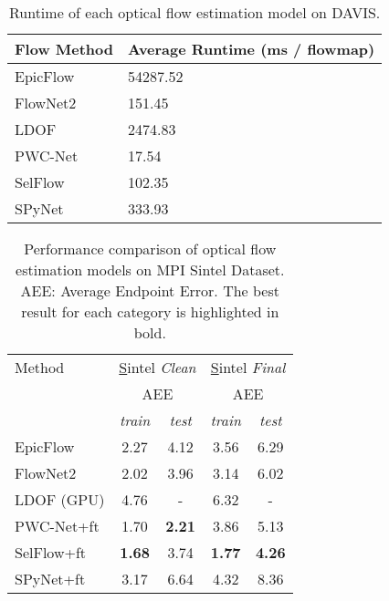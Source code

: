 \documentclass[10pt,letterpaper]{article}
\begin{document}
\begin{table*}
\footnotesize
\begin{center}
\begin{tabular}{l|l}
Flow Method & Average Runtime (ms / flowmap) \\ \hline
EpicFlow    & 54287.52                       \\
FlowNet2    & 151.45                         \\
LDOF        & 2474.83                        \\
PWC-Net     & 17.54                          \\
SelFlow     & 102.35                         \\
SPyNet      & 333.93                        
\end{tabular}
\caption{Runtime of each optical flow estimation model on DAVIS.}
\vspace{-0.7cm}
\end{center}
\end{table*}


\begin{table*}
\footnotesize
\begin{center}
\begin{tabular}{|l|cc|cc|}
\hline
Method     & \multicolumn{2}{c|}{{\ul Sintel \textit{Clean}}} & \multicolumn{2}{c|}{{\ul Sintel \textit{Final}}} \\
           & \multicolumn{2}{c|}{AEE}                & \multicolumn{2}{c|}{AEE}                \\
           & \textit{train}      & \textit{test}     & \textit{train}      & \textit{test}     \\ \hline
EpicFlow   & 2.27                & 4.12              & 3.56                & 6.29              \\
FlowNet2   & 2.02                & 3.96              & 3.14                & 6.02              \\
LDOF (GPU) & 4.76                & -                 & 6.32                & -                 \\
PWC-Net+ft & 1.70                & \textbf{2.21}     & 3.86                & 5.13              \\
SelFlow+ft & \textbf{1.68}       & 3.74              & \textbf{1.77}       & \textbf{4.26}     \\
SPyNet+ft  & 3.17                & 6.64              & 4.32                & 8.36              \\ \hline
\end{tabular}
\caption{Performance comparison of optical flow estimation models on MPI Sintel Dataset. AEE: Average Endpoint Error. The best result for each category is highlighted in bold.}
\vspace{-0.7cm}
\end{center}
\end{table*}
\end{document}
